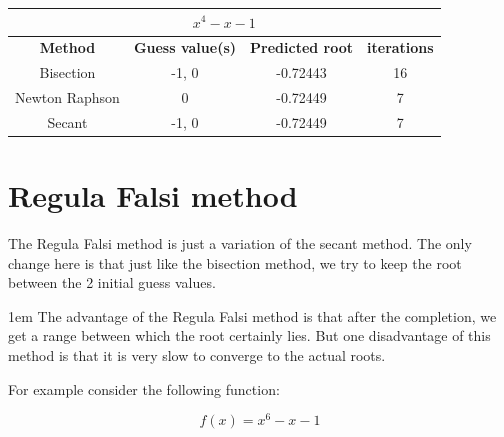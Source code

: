 \documentclass[12,a4paper]{article}
\begin{document}
    \begin{table}[h!]
        \centering
        \begin{tabular}{|c|c c c|} 
            \hline
            \multicolumn{4}{|c|}{$x^4 - x - 1$}\\
            \hline
            \textbf{Method}&\textbf{Guess value(s)}&\textbf{Predicted root}&\textbf{iterations} \\ [0.5ex] 
            \hline
            Bisection & -1, 0 & -0.72443 & 16 \\ 
            Newton Raphson & 0 & -0.72449 & 7 \\
            Secant &  -1, 0 & -0.72449 & 7 \\[1ex] 
            \hline
        \end{tabular}
    \end{table}
    \newpage
    \section{Regula Falsi method}
    The Regula Falsi method is just a variation of the secant method. The only change here is that just like the bisection method, we try to keep the root between the 2 initial guess values.
    
    \parskip 1em
    The advantage of the Regula Falsi method is that after the completion, we get a range between which the root certainly lies. But one disadvantage of this method is that it is very slow to converge to the actual roots.
    
    For example consider the following function:
    
    \begin{equation}
    f(x) = x^6 - x - 1
    \end{equation}
    
\end{document}
